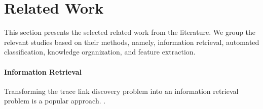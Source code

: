 \section{Related Work}
\label{sec:relwork}

This section presents the selected related work from the literature. We group the relevant studies based on their methods, namely, information retrieval, automated classification, knowledge organization, and feature extraction.


\paragraph{Information Retrieval} Transforming the trace link discovery problem into an information retrieval problem is a popular approach. .  %
